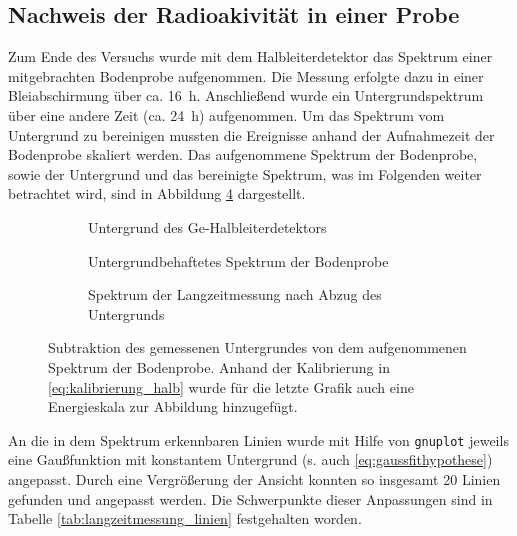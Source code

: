 \documentclass[11pt, a4paper]{article}
\numberwithin{equation}{section}
\begin{document}
\subsection{Nachweis der Radioakivität in einer Probe}

Zum Ende des Versuchs wurde mit dem Halbleiterdetektor das Spektrum einer mitgebrachten Bodenprobe aufgenommen.
Die Messung erfolgte dazu in einer Bleiabschirmung über ca. \SI{16}{\hour}. Anschließend wurde ein Untergrundspektrum über eine andere Zeit (ca. \SI{24}{\hour}) aufgenommen.
Um das Spektrum vom Untergrund zu bereinigen mussten die Ereignisse anhand der Aufnahmezeit der Bodenprobe skaliert werden.
Das aufgenommene Spektrum der Bodenprobe, sowie der Untergrund und das bereinigte Spektrum, was im Folgenden weiter betrachtet wird, sind in Abbildung \ref{fig:langzeitmessung_untergrundabzug} dargestellt.
\begin{figure}[hp]
	\centering
	\begin{subfigure}[b]{0.65\textwidth}
		\resizebox{!}{0.28\textheight}{
			
		}
		\caption{Untergrund des Ge-Halbleiterdetektors}
		\label{fig:untergrund}
	\end{subfigure}
	
	\begin{subfigure}[b]{0.65\textwidth}
		\resizebox{!}{0.28\textheight}{
			
		}
		\caption{Untergrundbehaftetes Spektrum der Bodenprobe}
		\label{fig:probe_mit_untergrund}
	\end{subfigure}
	
	\begin{subfigure}[b]{0.65\textwidth}
		\resizebox{!}{0.28\textheight}{
			
		}
		\caption{Spektrum der Langzeitmessung nach Abzug des Untergrunds}
		\label{fig:probe_ohne_untergrund}
	\end{subfigure}
	\caption{Subtraktion des gemessenen Untergrundes von dem aufgenommenen Spektrum der Bodenprobe. Anhand der Kalibrierung in \eqref{eq:kalibrierung_halb} wurde für die letzte Grafik auch eine Energieskala zur Abbildung hinzugefügt.}
	\label{fig:langzeitmessung_untergrundabzug}
\end{figure}
An die in dem Spektrum erkennbaren Linien wurde mit Hilfe von \texttt{gnuplot} jeweils eine Gaußfunktion mit konstantem Untergrund (s. auch \eqref{eq:gaussfithypothese}) angepasst.
Durch eine Vergrößerung der Ansicht konnten so insgesamt \num{20} Linien gefunden und angepasst werden.
Die Schwerpunkte dieser Anpassungen sind in Tabelle \ref{tab:langzeitmessung_linien} festgehalten worden. 
\end{document}
